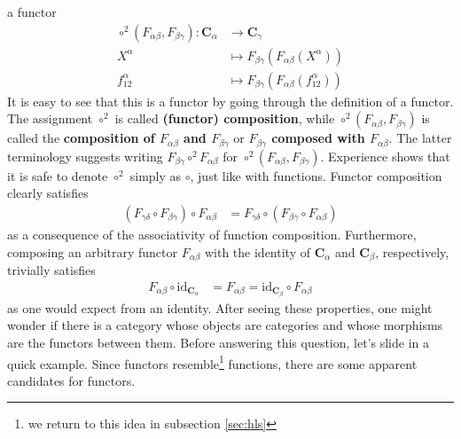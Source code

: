 a functor
\begin{align*}
  \circ^{2}(F_{\alpha\beta},F_{\beta\gamma})
  \colon
  \mathbf{C}_{\alpha}
  &\rightarrow
  \mathbf{C}_{\gamma}
  \\
  X^{\alpha}
  &\mapsto
  F_{\beta\gamma}(F_{\alpha\beta}(X^{\alpha}))
  \\
  f_{12}^{\alpha}
  &\mapsto
  F_{\beta\gamma}(F_{\alpha\beta}(f_{12}^{\alpha}))
\end{align*}
It is easy to see that this is a functor by going through the definition of a functor.
The assignment $\circ^{2}$ is called \textbf{(functor) composition}, while $\circ^{2}(F_{\alpha\beta},F_{\beta\gamma})$ is called the \textbf{composition of $F_{\alpha\beta}$ and $F_{\beta\gamma}$} or \textbf{$F_{\beta\gamma}$ composed with $F_{\alpha\beta}$}.
The latter terminology suggests writing $F_{\beta\gamma} \circ^{2} F_{\alpha\beta}$ for $\circ^{2}(F_{\alpha\beta},F_{\beta\gamma})$.
Experience shows that it is safe to denote $\circ^{2}$ simply as $\circ$, just like with functions.
Functor composition clearly satisfies
\begin{align*}
  \left(
    F_{\gamma\delta}
    \circ
    F_{\beta\gamma}
  \right)
  \circ
  F_{\alpha\beta}
  &=
  F_{\gamma\delta}
  \circ
  \left(
    F_{\beta\gamma}
    \circ
    F_{\alpha\beta}
  \right)
\end{align*}
as a consequence of the associativity of function composition.
Furthermore, composing an arbitrary functor $F_{\alpha\beta}$ with the identity of $\mathbf{C}_{\alpha}$ and $\mathbf{C}_{\beta}$, respectively, trivially satisfies
\begin{align*}
  F_{\alpha\beta}
  \circ
  \mathrm{id}_{\mathbf{C}_{\alpha}}
  &=
  F_{\alpha\beta}
  =
  \mathrm{id}_{\mathbf{C}_{\beta}}
  \circ
  F_{\alpha\beta}
\end{align*}
as one would expect from an identity.
After seeing these properties, one might wonder if there is a category whose objects are categories and whose morphisms are the functors between them.
Before answering this question, let's slide in a quick example.
Since functors resemble\footnote{we return to this idea in subsection \ref{sec:hls}} functions, there are some apparent candidates for functors.
\\
